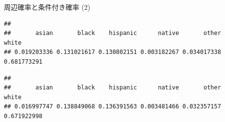\documentclass[
  ignorenonframetext,
]{beamer}
\newenvironment{Shaded}{\begin{snugshade}}{\end{snugshade}}
\newcommand{\CommentTok}[1]{\textcolor[rgb]{0.56,0.35,0.01}{\textit{#1}}}
\newcommand{\FunctionTok}[1]{\textcolor[rgb]{0.00,0.00,0.00}{#1}}
\newcommand{\NormalTok}[1]{#1}
\newcommand{\OtherTok}[1]{\textcolor[rgb]{0.56,0.35,0.01}{#1}}
\newcommand{\SpecialCharTok}[1]{\textcolor[rgb]{0.00,0.00,0.00}{#1}}
\newcommand{\StringTok}[1]{\textcolor[rgb]{0.31,0.60,0.02}{#1}}
\begin{document}
\begin{frame}[fragile]{周辺確率と条件付き確率 (2)}
\protect\hypertarget{ux5468ux8fbaux78baux7387ux3068ux6761ux4ef6ux4ed8ux304dux78baux7387-2}{}
\scriptsize

\begin{Shaded}
\end{Shaded}

\begin{verbatim}
## 
##       asian       black    hispanic      native       other       white 
## 0.019203336 0.131021617 0.130802151 0.003182267 0.034017338 0.681773291
\end{verbatim}

\begin{Shaded}
\end{Shaded}

\begin{verbatim}
## 
##       asian       black    hispanic      native       other       white 
## 0.016997747 0.138849068 0.136391563 0.003481466 0.032357157 0.671922998
\end{verbatim}

\normalsize
\end{frame}
\end{document}

